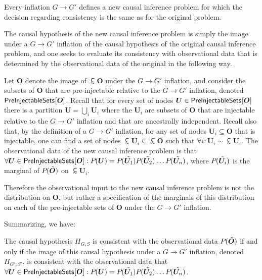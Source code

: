 
Every inflation $G\to G'$
 defines a new causal inference problem for which the decision regarding consistency is the same as for the original problem.  

The causal hypothesis of the new causal inference problem is simply the image under a $G\to G'$ inflation of the causal hypothesis of the original causal inference problem, and one seeks to evaluate its consistency with observational data that is determined by the observational data of the original in the following way.

Let  $\bm{O}$ denote the image of $\subsim{\bm{O}}$ under the $G \to G'$ inflation, and consider the subsets of $\bm{O}$ that are pre-injectable relative to the $G \to G'$ inflation, denoted ${\operatorname{\mathsf{PreInjectableSets}}_{}}\lbrack\bm{O}\rbrack$.  Recall that for every set of nodes $\bm{U} \in {\operatorname{\mathsf{PreInjectableSets}}_{}}\lbrack\bm{O}\rbrack$ there is a partition $\bm{U} = \bigcup_i \bm{U}_i$ where the $\bm{U}_i$ are subsets of $\bm{O}$ that are injectable relative to the $G \to G'$ inflation and that are ancestrally independent.  Recall also that, by the definition of a $G\to G'$ inflation, for any set of nodes $\bm{U}_i \subseteq \bm{O}$ that is injectable, one can find a set of nodes $\subsim{\bm{U}}_i \subseteq \subsim{\bm{O}}$ such that $\forall  i: \bm{U}_i \sim \subsim{\bm{U}}_i$.  The observational data of the new causal inference problem is that $\forall \bm{U} \in {\operatorname{\mathsf{PreInjectableSets}}_{}}\lbrack\bm{O}\rbrack: {P_{}}\lparen\bm{U}\rparen = {P_{}}\lparen\tilde{\bm{U}_1}\rparen{P_{}}\lparen\tilde{\bm{U}_2}\rparen \dots {P_{}}\lparen\tilde{\bm{U}_n}\rparen$, where ${P_{}}\lparen\tilde{\bm{U}_i}\rparen$ is the marginal of ${P_{}}\lparen\tilde{\bm{O}}\rparen$ on $\subsim{\bm{U}_i}$.

Therefore the observational input to the new causal inference problem is not the distribution on $\bm{O}$, but rather a specification of the marginals of this distribution on each of the pre-injectable sets of $\bm{O}$ under the $G\to G'$ inflation.

Summarizing, we have:
\begin{lemma}
The causal hypothesis $H_{G,S}$ is consistent with the observational data ${P_{}}\lparen\tilde{\bm{O}}\rparen$ if and only if the image of this causal hypothesis under a $G\to G'$ inflation, denoted $H_{G',S'}$, is consistent with the observational data that $\forall \bm{U} \in {\operatorname{\mathsf{PreInjectableSets}}_{}}\lbrack\bm{O}\rbrack: {P_{}}\lparen\bm{U}\rparen = {P_{}}\lparen\tilde{\bm{U}_1}\rparen{P_{}}\lparen\tilde{\bm{U}_2}\rparen \dots {P_{}}\lparen\tilde{\bm{U}_n}\rparen$.
\end{lemma}

